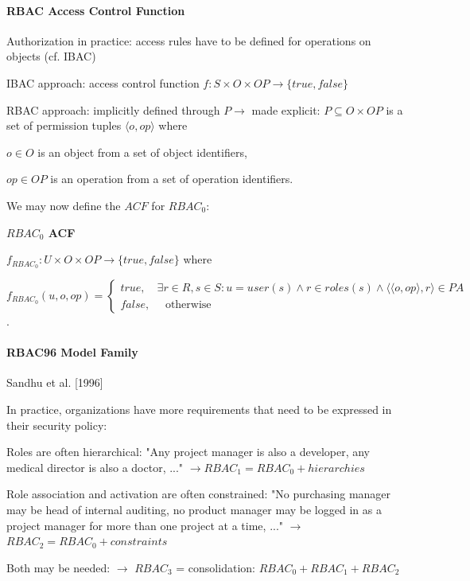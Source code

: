 \documentclass[a4paper]{article}
\renewcommand{\note}[2]{\begin{noteBox} \textbf{#1} #2 \end{noteBox}}
\begin{document}
\begin{multicols}{3}
    \paragraph{RBAC Access Control Function}
    \begin{itemize*}
        \item Authorization in practice: access rules have to be defined for operations on objects (cf. IBAC)
        \item IBAC approach: access control function $f:S\times O\times OP\rightarrow \{true,false\}$
        \item RBAC approach: implicitly defined through $P\rightarrow$ made explicit: $P\subseteq O\times OP$ is a set of permission tuples $⟨o,op⟩$ where
        \begin{itemize*}
            \item $o\in O$ is an object from a set of object identifiers,
            \item $op\in OP$ is an operation from a set of operation identifiers.
        \end{itemize*}
        \item We may now define the $ACF$ for $RBAC_0$:
    \end{itemize*}

    \note{$RBAC_0$ ACF}{
        \begin{itemize*}
            \item $f_{RBAC_0}:U \times O\times OP\rightarrow\{true,false\}$ where
            \item $f_{RBAC_0} (u,o,op)= \begin{cases} true, \quad \exists r\in R,s\in S:u=user(s)\wedge r\in roles(s)\wedge ⟨⟨o,op⟩,r⟩ \in PA \\ false, \quad\text{ otherwise } \end{cases}$.
        \end{itemize*}
    }

    \paragraph{RBAC96 Model Family}
    Sandhu et al. [1996]

    In practice, organizations have more requirements that need to be expressed in their security policy:
    \begin{itemize*}
        \item Roles are often hierarchical: "Any project manager is also a developer, any medical director is also a doctor, ..." $\rightarrow RBAC_1 = RBAC_0 + hierarchies$
        \item Role association and activation are often constrained: "No purchasing manager may be head of internal auditing, no product manager may be logged in as a project manager for more than one project at a time, ..." $\rightarrow$ $RBAC_2 = RBAC_0 + constraints$
        \item Both may be needed: $\rightarrow$ $RBAC_3$ = consolidation: $RBAC_0 + RBAC_1 + RBAC_2$
    \end{itemize*}


\end{multicols}
\end{document}
